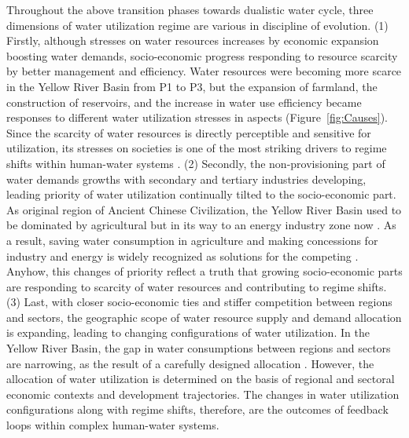 \documentclass[9pt, twocolumn, twoside, lineno]{pnas-new}
\begin{document}
Throughout the above transition phases towards dualistic water cycle, three dimensions of water utilization regime are various in discipline of evolution. 
(1) Firstly, although stresses on water resources increases by economic expansion boosting water demands, socio-economic progress responding to resource scarcity by better management and efficiency. Water resources were becoming more scarce in the Yellow River Basin from P1 to P3, but the expansion of farmland, the construction of reservoirs, and the increase in water use efficiency became responses to different water utilization stresses in aspects (Figure~\ref{fig:Causes}). Since the scarcity of water resources is directly perceptible and sensitive for utilization, its stresses on societies is one of the most striking drivers to regime shifts within human-water systems \cite{qinFlexibilityIntensityGlobal2019}.
(2) Secondly, the non-provisioning part of water demands growths with secondary and tertiary industries developing, leading priority of water utilization continually tilted to the socio-economic part. As original region of Ancient Chinese Civilization, the Yellow River Basin used to be dominated by agricultural but in its way to an energy industry zone now \cite{WillEnergyBases}. As a result, saving water consumption in agriculture and making concessions for industry and energy is widely recognized as solutions for the competing \cite{xiangWillEnergyIndustry2016,bebbWaterRightsTransfers2011}. Anyhow, this changes of priority reflect a truth that growing socio-economic parts are responding to scarcity of water resources and contributing to regime shifts.
(3) Last, with closer socio-economic ties and stiffer competition between regions and sectors, the geographic scope of water resource supply and demand allocation is expanding, leading to changing configurations of water utilization. In the Yellow River Basin, the gap in water consumptions between regions and sectors are narrowing, as the result of a carefully designed allocation \cite{wangThirtyYearsYellow2018}. However, the allocation of water utilization is determined on the basis of regional and sectoral economic contexts and development trajectories\cite{wangThirtyYearsYellow2018}. The changes in water utilization configurations along with regime shifts, therefore, are the outcomes of feedback loops within complex human-water systems.
\end{document}
